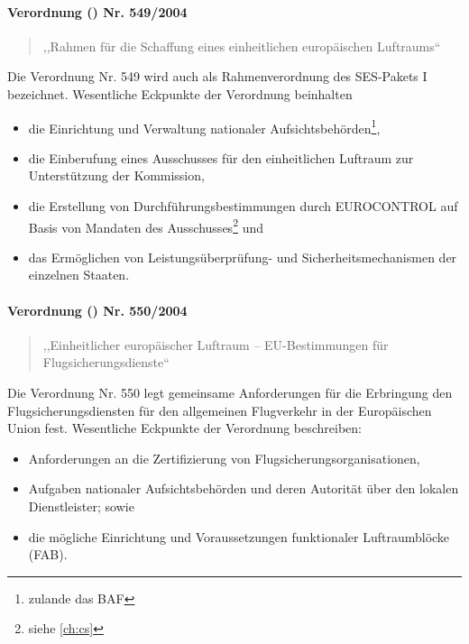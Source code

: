 \pagebreak

\paragraph{Verordnung () Nr. 549/2004} \label{er_549}

    \begin{quote}
        ,,Rahmen für die Schaffung eines einheitlichen europäischen Luftraums``\\
        \cite{2004R0549, 2004R0549_summary}
    \end{quote}

    \noindent
    Die Verordnung Nr. 549 wird auch als Rahmenverordnung des \ac{SES}-Pakets I bezeichnet.
    Wesentliche Eckpunkte der Verordnung beinhalten
    
    \begin{itemize}
        \item die Einrichtung und Verwaltung nationaler Aufsichtsbehörden\footnote{zulande das \acf{BAF}},
        \item die Einberufung eines Ausschusses für den einheitlichen Luftraum zur Unterstützung der Kommission,
        \item die Erstellung von Durchführungsbestimmungen durch EUROCONTROL auf Basis von Mandaten des Ausschusses\footnote{siehe \ref{ch:cs}} und
        \item das Ermöglichen von Leistungsüberprüfung- und Sicherheitsmechanismen der einzelnen Staaten. \cite{2004R0549_summary}
    \end{itemize}
        
\paragraph{Verordnung () Nr. 550/2004} \label{er_550}
    \begin{quote}
        ,,Einheitlicher europäischer Luftraum – EU-Bestimmungen für Flugsicherungsdienste`` 
        \cite{2004R0550, 2004R0550_summary}
    \end{quote}

    \noindent
    Die Verordnung Nr. 550 legt gemeinsame Anforderungen für die Erbringung den Flugsicherungsdiensten für den allgemeinen Flugverkehr in der Europäischen Union fest. 
    Wesentliche Eckpunkte der Verordnung beschreiben:
    
    \begin{itemize}
        \item Anforderungen an die Zertifizierung von Flugsicherungsorganisationen,
        \item Aufgaben nationaler Aufsichtsbehörden und deren Autorität über den lokalen Dienstleister; sowie
        \item die mögliche Einrichtung und Voraussetzungen funktionaler Luftraumblöcke (\acs{FAB}). \cite{2004R0550_summary}
    \end{itemize}

